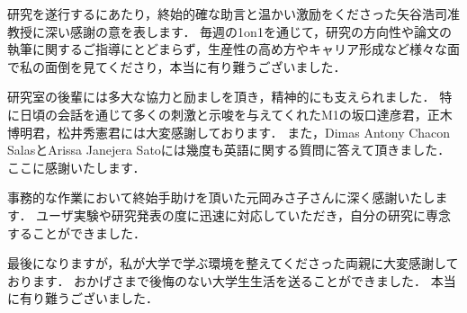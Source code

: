 
\begin{acknowledgements}

研究を遂行するにあたり，終始的確な助言と温かい激励をくださった矢谷浩司准教授に深い感謝の意を表します．
毎週の1on1を通じて，研究の方向性や論文の執筆に関するご指導にとどまらず，生産性の高め方やキャリア形成など様々な面で私の面倒を見てくださり，本当に有り難うございました．

研究室の後輩には多大な協力と励ましを頂き，精神的にも支えられました．
特に日頃の会話を通じて多くの刺激と示唆を与えてくれたM1の坂口達彦君，正木博明君，松井秀憲君には大変感謝しております．
また，Dimas Antony Chacon SalasとArissa Janejera Satoには幾度も英語に関する質問に答えて頂きました．
ここに感謝いたします．

事務的な作業において終始手助けを頂いた元岡みさ子さんに深く感謝いたします．
ユーザ実験や研究発表の度に迅速に対応していただき，自分の研究に専念することができました．

最後になりますが，私が大学で学ぶ環境を整えてくださった両親に大変感謝しております．
おかげさまで後悔のない大学生生活を送ることができました．
本当に有り難うございました．

\end{acknowledgements}

